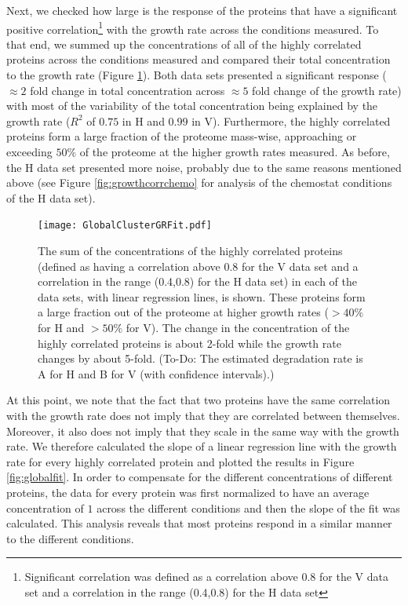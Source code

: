 \documentclass[notitlepage]{article}
\begin{document}
Next, we checked how large is the response of the proteins that have a significant positive correlation\footnote{Significant correlation was defined as a correlation above 0.8 for the V data set and a correlation in the range (0.4,0.8) for the H data set} with the growth rate across the conditions measured.
To that end, we summed up the concentrations of all of the highly correlated proteins across the conditions measured and compared their total concentration to the growth rate (Figure \ref{fig:globalgrcorr}).
Both data sets presented a significant response ($\approx 2$ fold change in total concentration across $\approx 5$ fold change of the growth rate) with most of the variability of the total concentration being explained by the growth rate ($R^2$ of $0.75$ in H and $0.99$ in V). 
Furthermore, the highly correlated proteins form a large fraction of the proteome mass-wise, approaching or exceeding $50\%$ of the proteome at the higher growth rates measured.
As before, the H data set presented more noise, probably due to the same reasons mentioned above (see Figure \ref{fig:growthcorrchemo} for analysis of the chemostat conditions of the H data set).

\begin{figure}[h]
\centering
\texttt{[image: GlobalClusterGRFit.pdf]}
\caption{
The sum of the concentrations of the highly correlated proteins (defined as having a correlation above 0.8 for the V data set and a correlation in the range (0.4,0.8) for the H data set) in each of the data sets, with linear regression lines, is shown.
These proteins form a large fraction out of the proteome at higher growth rates ($>40\%$ for H and $>50\%$ for V).
The change in the concentration of the highly correlated proteins is about 2-fold while the growth rate changes by about 5-fold.
(To-Do: The estimated degradation rate is A for H and B for V (with confidence intervals).)
}
\label{fig:globalgrcorr}
\end{figure}

At this point, we note that the fact that two proteins have the same correlation with the growth rate does not imply that they are correlated between themselves.
Moreover, it also does not imply that they scale in the same way with the growth rate.
We therefore calculated the slope of a linear regression line with the growth rate for every highly correlated protein and plotted the results in Figure \ref{fig:globalfit}.
In order to compensate for the different concentrations of different proteins, the data for every protein was first normalized to have an average concentration of $1$ across the different conditions and then the slope of the fit was calculated.
This analysis reveals that most proteins respond in a similar manner to the different conditions.
\end{document}
